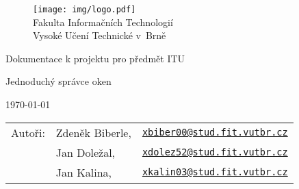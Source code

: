 \begin{titlepage}

\begin{figure}[!h]
  \centering
  \texttt{[image: img/logo.pdf]} \\
  Fakulta Informačních Technologií \\
  Vysoké Učení Technické v~Brně
\end{figure}

\vfill

\begin{center}
\begin{Large}
Dokumentace k projektu pro předmět ITU\\
\end{Large}
\bigskip
\begin{Huge}
Jednoduchý správce oken\\
\end{Huge}
\end{center}

\vfill

\begin{center}
\begin{Large}
\today
\end{Large}
\end{center}

\vfill

\begin{flushleft}
\begin{large}
\begin{tabular}{lll}
Autoři: & Zdeněk Biberle, & \href{mailto:xbiber00@stud.fit.vutbr.cz}{\nolinkurl{xbiber00@stud.fit.vutbr.cz}} \\
        & Jan Doležal,    & \href{mailto:xdolez52@stud.fit.vutbr.cz}{\nolinkurl{xdolez52@stud.fit.vutbr.cz}} \\
        & Jan Kalina,     & \href{mailto:xkalin03@stud.fit.vutbr.cz}{\nolinkurl{xkalin03@stud.fit.vutbr.cz}} \\
\end{tabular}
\end{large}
\end{flushleft}
\end{titlepage}
